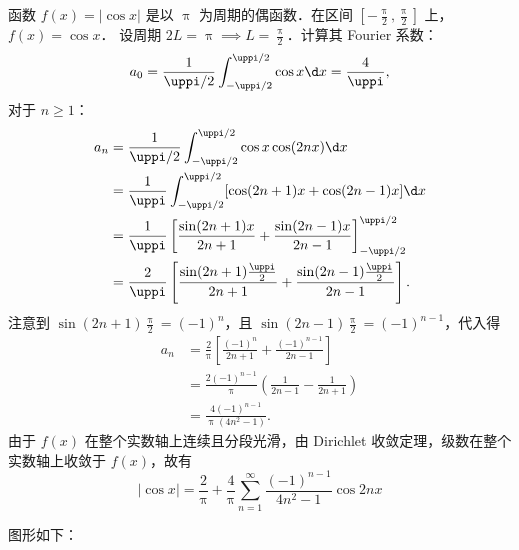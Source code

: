 \begin{myproof}
    函数 $f(x) = |\cos x|$ 是以 $\uppi$ 为周期的偶函数．在区间 $\left[-\frac{\uppi}{2}, \frac{\uppi}{2}\right]$ 上，$f(x) = \cos x$．
    设周期 $2L = \uppi \implies L = \frac{\uppi}{2}$．计算其 Fourier 系数：
    \begin{equation}\label{eq:abs-cos-a0}
        a_0 = \frac{1}{\uppi/2} \int_{-\uppi/2}^{\uppi/2} \cos x \d x = \frac{4}{\uppi},
    \end{equation}
    对于 $n \geqslant 1$：
    \begin{equation}\label{eq:abs-cos-an}
        \begin{aligned}
            a_n & = \frac{1}{\uppi/2} \int_{-\uppi/2}^{\uppi/2} \cos x \cos(2nx) \d x                                               \\
                & = \frac{1}{\uppi} \int_{-\uppi/2}^{\uppi/2} [\cos(2n+1)x + \cos(2n-1)x] \d x                                      \\
                & = \frac{1}{\uppi} \left[ \frac{\sin(2n+1)x}{2n+1} + \frac{\sin(2n-1)x}{2n-1} \right]_{-\uppi/2}^{\uppi/2}         \\
                & = \frac{2}{\uppi} \left[ \frac{\sin(2n+1)\frac{\uppi}{2}}{2n+1} + \frac{\sin(2n-1)\frac{\uppi}{2}}{2n-1} \right].
        \end{aligned}
    \end{equation}
    注意到 $\sin(2n+1)\frac{\uppi}{2} = (-1)^n$，且 $\sin(2n-1)\frac{\uppi}{2} = (-1)^{n-1}$，代入得
    \begin{equation}\label{eq:abs-cos-an-result}
        \begin{aligned}
            a_n & = \frac{2}{\uppi} \left[ \frac{(-1)^n}{2n+1} + \frac{(-1)^{n-1}}{2n-1} \right] \\
                & = \frac{2(-1)^{n-1}}{\uppi} \left( \frac{1}{2n-1} - \frac{1}{2n+1} \right)     \\
                & = \frac{4(-1)^{n-1}}{\uppi(4n^2 - 1)}.
        \end{aligned}
    \end{equation}
    由于 $f(x)$ 在整个实数轴上连续且分段光滑，由 Dirichlet 收敛定理，级数在整个实数轴上收敛于 $f(x)$，故有
    \begin{equation}
        \boxed{|\cos x| = \frac{2}{\uppi} + \frac{4}{\uppi} \sum_{n=1}^{\infty} \frac{(-1)^{n-1}}{4n^2 - 1} \cos 2nx}
    \end{equation}


    图形如下：
    \begin{center}
\end{center}
\end{myproof}
